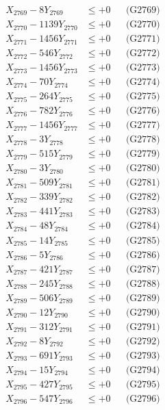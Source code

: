 \documentclass[a4paper,10pt]{article}
\begin{document}
{\begin{align}
X_{2769} - 8Y_{2769} &\leq +0 && \text{(G2769)} \\
X_{2770} - 1139Y_{2770} &\leq +0 && \text{(G2770)} \\
\allowbreak
X_{2771} - 1456Y_{2771} &\leq +0 && \text{(G2771)} \\
X_{2772} - 546Y_{2772} &\leq +0 && \text{(G2772)} \\
X_{2773} - 1456Y_{2773} &\leq +0 && \text{(G2773)} \\
X_{2774} - 70Y_{2774} &\leq +0 && \text{(G2774)} \\
X_{2775} - 264Y_{2775} &\leq +0 && \text{(G2775)} \\
X_{2776} - 782Y_{2776} &\leq +0 && \text{(G2776)} \\
X_{2777} - 1456Y_{2777} &\leq +0 && \text{(G2777)} \\
X_{2778} - 3Y_{2778} &\leq +0 && \text{(G2778)} \\
X_{2779} - 515Y_{2779} &\leq +0 && \text{(G2779)} \\
X_{2780} - 3Y_{2780} &\leq +0 && \text{(G2780)} \\
\allowbreak
X_{2781} - 509Y_{2781} &\leq +0 && \text{(G2781)} \\
X_{2782} - 339Y_{2782} &\leq +0 && \text{(G2782)} \\
X_{2783} - 441Y_{2783} &\leq +0 && \text{(G2783)} \\
X_{2784} - 48Y_{2784} &\leq +0 && \text{(G2784)} \\
X_{2785} - 14Y_{2785} &\leq +0 && \text{(G2785)} \\
X_{2786} - 5Y_{2786} &\leq +0 && \text{(G2786)} \\
X_{2787} - 421Y_{2787} &\leq +0 && \text{(G2787)} \\
X_{2788} - 245Y_{2788} &\leq +0 && \text{(G2788)} \\
X_{2789} - 506Y_{2789} &\leq +0 && \text{(G2789)} \\
X_{2790} - 12Y_{2790} &\leq +0 && \text{(G2790)} \\
\allowbreak
X_{2791} - 312Y_{2791} &\leq +0 && \text{(G2791)} \\
X_{2792} - 8Y_{2792} &\leq +0 && \text{(G2792)} \\
X_{2793} - 691Y_{2793} &\leq +0 && \text{(G2793)} \\
X_{2794} - 15Y_{2794} &\leq +0 && \text{(G2794)} \\
X_{2795} - 427Y_{2795} &\leq +0 && \text{(G2795)} \\
X_{2796} - 547Y_{2796} &\leq +0 && \text{(G2796)} \\

\end{align}}
\end{document}
